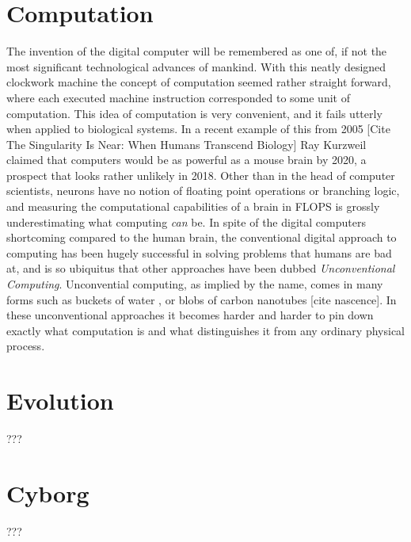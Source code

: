 \section{Computation}
The invention of the digital computer will be remembered as one of, if not the
most significant technological advances of mankind.
%
With this neatly designed clockwork machine the concept of computation seemed
rather straight forward, where each executed machine instruction corresponded to
some unit of computation.
%
This idea of computation is very convenient, and it fails utterly when
applied to biological systems.
In a recent example of this from 2005 [Cite The Singularity Is Near: When Humans
Transcend Biology] Ray Kurzweil claimed that computers would be as powerful as a
mouse brain by 2020, a prospect that looks rather unlikely in 2018.
Other than in the head of computer scientists, neurons have no notion of
floating point operations or branching logic, and measuring the computational
capabilities of a brain in FLOPS is grossly underestimating what computing
\emph{can} be.
%
In spite of the digital computers shortcoming compared to the human brain, the
conventional digital approach to computing has been hugely successful in solving
problems that humans are bad at, and is so ubiquitus that other approaches
have been dubbed \emph{Unconventional Computing}.
%
Unconvential computing, as implied by the name, comes in many forms such as
buckets of water \cite{fernando_pattern_2003}, or blobs of carbon nanotubes
[cite nascence]. 
%
In these unconventional approaches it becomes harder and harder to pin down
exactly what computation is and what distinguishes it from any ordinary physical
process.
%
\section{Evolution}
???
\section{Cyborg}
???
\cleardoublepage

